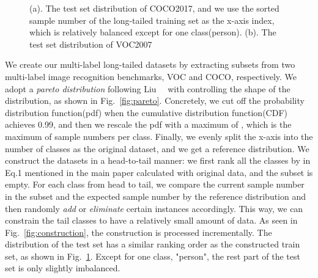 \documentclass[runningheads]{llncs}
\begin{document}
\begin{figure}[t]
     \hfill
    \caption{
        (a). The test set distribution of COCO2017, and we use the sorted sample number of the long-tailed training set as the x-axis index, which is relatively balanced except for one class(person).
        (b). The test set distribution of VOC2007
    }
    \label{fig:test_dist}
\end{figure}
We create our multi-label long-tailed datasets by extracting subsets from two multi-label image recognition benchmarks, VOC and COCO, respectively.
We adopt a \textit{pareto distribution}  following Liu~\etal~\cite{liu2019largescale} with  controlling the shape of the distribution, as shown in Fig.~\ref{fig:pareto}. 
Concretely, we cut off the probability distribution function(pdf) when the cumulative distribution function(CDF) achieves 0.99, and then we rescale the pdf with a maximum of , which is the maximum of sample numbers per class. Finally, we evenly split the x-axis into the number of classes as the original dataset, and we get a reference distribution.
We construct the datasets in a head-to-tail manner:
we first rank all the classes by  in Eq.1 mentioned in the main paper calculated with original data, and the subset is empty. For each class  from head to tail, we compare the current sample number in the subset and the expected sample number by the reference distribution and then randomly \textit{add} or \textit{eliminate} certain instances accordingly. 
This way, we can constrain the tail classes to have a relatively small amount of data.
As seen in Fig.~\ref{fig:construction}, the construction is processed incrementally.
The distribution of the test set has a similar ranking order as the constructed train set, as shown in Fig.~\ref{fig:test_dist}. 
Except for one class, "person", the rest part of the test set is only slightly imbalanced.
\end{document}
